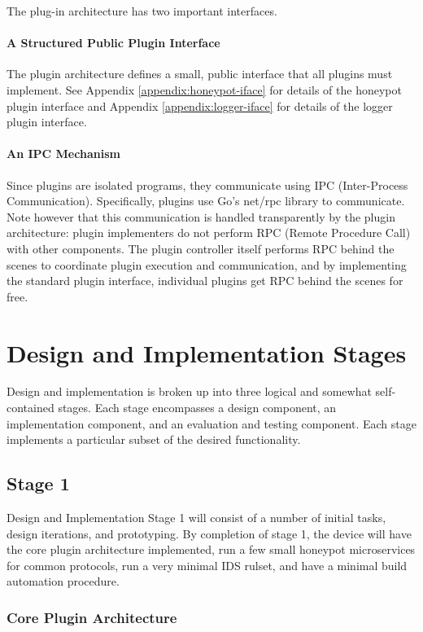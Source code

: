 The plug-in architecture has two important interfaces.

\paragraph{A Structured Public Plugin Interface}
The plugin architecture defines a small, public interface that all plugins
must implement. See Appendix \ref{appendix:honeypot-iface} for details of the
honeypot plugin interface and Appendix \ref{appendix:logger-iface} for details
of the logger plugin interface.

\paragraph{An IPC Mechanism}
Since plugins are isolated programs, they communicate using IPC (Inter-Process Communication). Specifically,
plugins use Go's net/rpc library to communicate. Note however that this
communication is handled transparently by the plugin architecture:
plugin implementers do not perform RPC (Remote Procedure Call) with other components. The
plugin controller itself performs RPC behind the scenes to coordinate
plugin execution and communication, and by implementing the standard
plugin interface, individual plugins get RPC behind the scenes for free.


\section{Design and Implementation Stages}

Design and implementation is broken up into three logical and somewhat
self-contained stages. Each stage encompasses a design component, an
implementation component, and an evaluation and testing component. Each stage
implements a particular subset of the desired functionality.

\subsection{Stage 1}

Design and Implementation Stage 1 will consist of a number of initial tasks,
design iterations, and prototyping. By completion of stage 1, the device
will have the core plugin architecture implemented, run a few small honeypot
microservices for common protocols, run a very minimal IDS rulset,
and have a minimal build automation procedure.

\subsubsection{Core Plugin Architecture}

